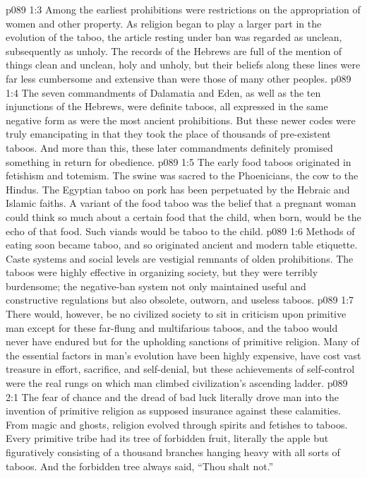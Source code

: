 \vs p089 1:3 Among the earliest prohibitions were restrictions on the appropriation of women and other property. As religion began to play a larger part in the evolution of the taboo, the article resting under ban was regarded as unclean, subsequently as unholy. The records of the Hebrews are full of the mention of things clean and unclean, holy and unholy, but their beliefs along these lines were far less cumbersome and extensive than were those of many other peoples.
\vs p089 1:4 The seven commandments of Dalamatia and Eden, as well as the ten injunctions of the Hebrews, were definite taboos, all expressed in the same negative form as were the most ancient prohibitions. But these newer codes were truly emancipating in that they took the place of thousands of pre\hyp{}existent taboos. And more than this, these later commandments definitely promised something in return for obedience.
\vs p089 1:5 The early food taboos originated in fetishism and totemism. The swine was sacred to the Phoenicians, the cow to the Hindus. The Egyptian taboo on pork has been perpetuated by the Hebraic and Islamic faiths. A variant of the food taboo was the belief that a pregnant woman could think so much about a certain food that the child, when born, would be the echo of that food. Such viands would be taboo to the child.
\vs p089 1:6 Methods of eating soon became taboo, and so originated ancient and modern table etiquette. Caste systems and social levels are vestigial remnants of olden prohibitions. The taboos were highly effective in organizing society, but they were terribly burdensome; the negative\hyp{}ban system not only maintained useful and constructive regulations but also obsolete, outworn, and useless taboos.
\vs p089 1:7 There would, however, be no civilized society to sit in criticism upon primitive man except for these far\hyp{}flung and multifarious taboos, and the taboo would never have endured but for the upholding sanctions of primitive religion. Many of the essential factors in man’s evolution have been highly expensive, have cost vast treasure in effort, sacrifice, and self\hyp{}denial, but these achievements of self\hyp{}control were the real rungs on which man climbed civilization’s ascending ladder.
\vs p089 2:1 The fear of chance and the dread of bad luck literally drove man into the invention of primitive religion as supposed insurance against these calamities. From magic and ghosts, religion evolved through spirits and fetishes to taboos. Every primitive tribe had its tree of forbidden fruit, literally the apple but figuratively consisting of a thousand branches hanging heavy with all sorts of taboos. And the forbidden tree always said, “Thou shalt not.”
